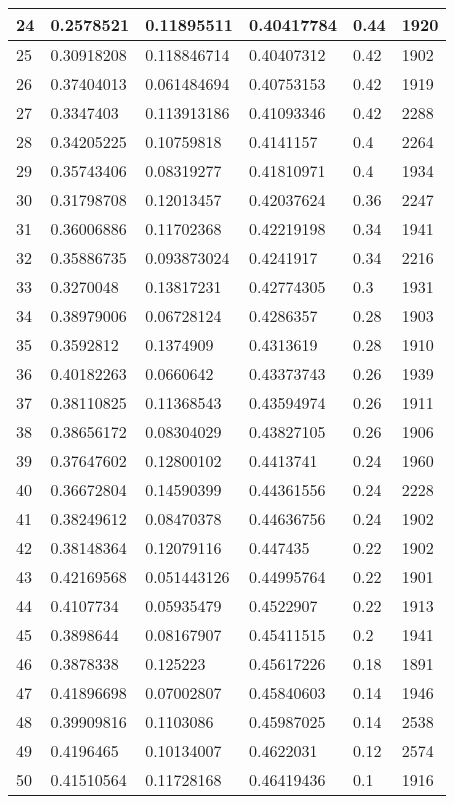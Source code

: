 \begin{longtable}{|l|l|l|l|l|l|}
24 & 0.2578521 & 0.11895511 & 0.40417784 & 0.44 & 1920 \\ \hline 
25 & 0.30918208 & 0.118846714 & 0.40407312 & 0.42 & 1902 \\ \hline 
26 & 0.37404013 & 0.061484694 & 0.40753153 & 0.42 & 1919 \\ \hline 
27 & 0.3347403 & 0.113913186 & 0.41093346 & 0.42 & 2288 \\ \hline 
28 & 0.34205225 & 0.10759818 & 0.4141157 & 0.4 & 2264 \\ \hline 
29 & 0.35743406 & 0.08319277 & 0.41810971 & 0.4 & 1934 \\ \hline 
30 & 0.31798708 & 0.12013457 & 0.42037624 & 0.36 & 2247 \\ \hline 
31 & 0.36006886 & 0.11702368 & 0.42219198 & 0.34 & 1941 \\ \hline 
32 & 0.35886735 & 0.093873024 & 0.4241917 & 0.34 & 2216 \\ \hline 
33 & 0.3270048 & 0.13817231 & 0.42774305 & 0.3 & 1931 \\ \hline 
34 & 0.38979006 & 0.06728124 & 0.4286357 & 0.28 & 1903 \\ \hline 
35 & 0.3592812 & 0.1374909 & 0.4313619 & 0.28 & 1910 \\ \hline 
36 & 0.40182263 & 0.0660642 & 0.43373743 & 0.26 & 1939 \\ \hline 
37 & 0.38110825 & 0.11368543 & 0.43594974 & 0.26 & 1911 \\ \hline 
38 & 0.38656172 & 0.08304029 & 0.43827105 & 0.26 & 1906 \\ \hline 
39 & 0.37647602 & 0.12800102 & 0.4413741 & 0.24 & 1960 \\ \hline 
40 & 0.36672804 & 0.14590399 & 0.44361556 & 0.24 & 2228 \\ \hline 
41 & 0.38249612 & 0.08470378 & 0.44636756 & 0.24 & 1902 \\ \hline 
42 & 0.38148364 & 0.12079116 & 0.447435 & 0.22 & 1902 \\ \hline 
43 & 0.42169568 & 0.051443126 & 0.44995764 & 0.22 & 1901 \\ \hline 
44 & 0.4107734 & 0.05935479 & 0.4522907 & 0.22 & 1913 \\ \hline 
45 & 0.3898644 & 0.08167907 & 0.45411515 & 0.2 & 1941 \\ \hline 
46 & 0.3878338 & 0.125223 & 0.45617226 & 0.18 & 1891 \\ \hline 
47 & 0.41896698 & 0.07002807 & 0.45840603 & 0.14 & 1946 \\ \hline 
48 & 0.39909816 & 0.1103086 & 0.45987025 & 0.14 & 2538 \\ \hline 
49 & 0.4196465 & 0.10134007 & 0.4622031 & 0.12 & 2574 \\ \hline 
50 & 0.41510564 & 0.11728168 & 0.46419436 & 0.1 & 1916 \\ \hline 
\end{longtable}